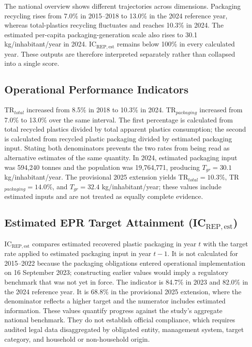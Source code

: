 \documentclass[review,10pt]{elsarticle}
\newcommand{\revpar}[1]{#1\par\medskip}
\newcommand{\changepar}[1]{#1\par\medskip}
\begin{document}
\revpar{The national overview shows different trajectories across dimensions. Packaging recycling rises from 7.0\% in 2015--2018 to 13.0\% in the 2024 reference year, whereas total-plastics recycling fluctuates and reaches 10.3\% in 2024. The estimated per-capita packaging-generation scale also rises to 30.1 kg/inhabitant/year in 2024. IC$_{\mathrm{REP,est}}$ remains below 100\% in every calculated year. These outputs are therefore interpreted separately rather than collapsed into a single score.}

\subsection{Operational Performance Indicators}

\changepar{TR$_{total}$ increased from 8.5\% in 2018 to 10.3\% in 2024. TR$_{packaging}$ increased from 7.0\% to 13.0\% over the same interval. The first percentage is calculated from total recycled plastics divided by total apparent plastics consumption; the second is calculated from recycled plastic packaging divided by estimated packaging input. Stating both denominators prevents the two rates from being read as alternative estimates of the same quantity. In 2024, estimated packaging input was 594,240 tonnes and the population was 19,764,771, producing $T_{gr}=30.1$ kg/inhabitant/year. The provisional 2025 extension yields TR$_{total}=10.3\%$, TR$_{packaging}=14.0\%$, and $T_{gr}=32.4$ kg/inhabitant/year; these values include estimated inputs and are not treated as equally complete evidence.}

\subsection{Estimated EPR Target Attainment (IC$_{\mathrm{REP,est}}$)}

\changepar{IC$_{\mathrm{REP,est}}$ compares estimated recovered plastic packaging in year $t$ with the target rate applied to estimated packaging input in year $t-1$. It is not calculated for 2015--2022 because the packaging obligations entered operational implementation on 16 September 2023; constructing earlier values would imply a regulatory benchmark that was not yet in force. The indicator is 84.7\% in 2023 and 82.0\% in the 2024 reference year. It is 68.8\% in the provisional 2025 extension, where the denominator reflects a higher target and the numerator includes estimated information. These values quantify progress against the study's aggregate national benchmark. They do not establish official compliance, which requires audited legal data disaggregated by obligated entity, management system, target category, and household or non-household origin.}
\end{document}
